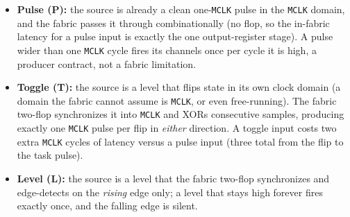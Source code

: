 \begin{itemize}
	\item \textbf{Pulse (P):} the source is already a clean one-\texttt{MCLK} pulse in the \texttt{MCLK} domain, and the fabric passes it through combinationally (no flop, so the in-fabric latency for a pulse input is exactly the one output-register stage). A pulse wider than one \texttt{MCLK} cycle fires its channels once per cycle it is high, a producer contract, not a fabric limitation.
	\item \textbf{Toggle (T):} the source is a level that flips state in its own clock domain (a domain the fabric cannot assume is \texttt{MCLK}, or even free-running). The fabric two-flop synchronizes it into \texttt{MCLK} and XORs consecutive samples, producing exactly one \texttt{MCLK} pulse per flip in \textit{either} direction. A toggle input costs two extra \texttt{MCLK} cycles of latency versus a pulse input (three total from the flip to the task pulse).
	\item \textbf{Level (L):} the source is a level that the fabric two-flop synchronizes and edge-detects on the \textit{rising} edge only; a level that stays high forever fires exactly once, and the falling edge is silent.
\end{itemize}

